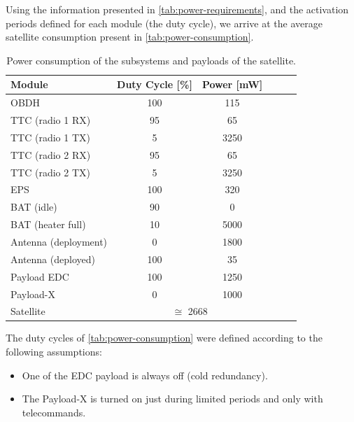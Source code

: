 Using the information presented in \autoref{tab:power-requirements}, and the activation periods defined for each module (the duty cycle), we arrive at the average satellite consumption present in \autoref{tab:power-consumption}.

\begin{table}[!h]
    \centering
    \begin{tabular}{lccccc}
        \toprule[1.5pt]
        \textbf{Module} & \textbf{Duty Cycle [\%]}    & \textbf{Power [mW]} \\
        \midrule
        OBDH                    & 100   & 115 \\
        TTC (radio 1 RX)        & 95    & 65 \\
        TTC (radio 1 TX)        & 5     & 3250 \\
        TTC (radio 2 RX)        & 95    & 65 \\
        TTC (radio 2 TX)        & 5     & 3250 \\
        EPS                     & 100   & 320 \\
        BAT (idle)              & 90    & 0 \\
        BAT (heater full)       & 10    & 5000 \\
        Antenna (deployment)    & 0     & 1800 \\
        Antenna (deployed)      & 100   & 35 \\
        Payload EDC             & 100   & 1250 \\
        Payload-X               & 0     & 1000 \\
        \cmidrule{2-3}
        Satellite               & \multicolumn{2}{c}{$\cong$ 2668} \\
        \bottomrule[1.5pt]
    \end{tabular}
    \caption{Power consumption of the subsystems and payloads of the satellite.}
    \label{tab:power-consumption}
\end{table}

The duty cycles of \autoref{tab:power-consumption} were defined according to the following assumptions:

\begin{itemize}
    \item One of the EDC payload is always off (cold redundancy).
    \item The Payload-X is turned on just during limited periods and only with telecommands.
\end{itemize}

